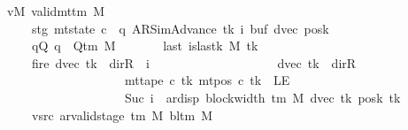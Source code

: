 \begin{isabellebody}
\ \ \ vM{\isacharcolon}{\kern0pt}\ {\isachardoublequoteopen}valid{\isacharunderscore}{\kern0pt}mttm\ M{\isachardoublequoteclose}\isanewline
\ \ \ \ \ \ \ stg{\isacharcolon}{\kern0pt}\ {\isachardoublequoteopen}mt{\isacharunderscore}{\kern0pt}state\ c{\isacharprime}{\kern0pt}\ {\isacharequal}{\kern0pt}\ {\isacharparenleft}{\kern0pt}q{\isacharcomma}{\kern0pt}\ AR{\isacharunderscore}{\kern0pt}SimAdvance{\isacharcomma}{\kern0pt}\ tk{\isacharcomma}{\kern0pt}\ i{\isacharcomma}{\kern0pt}\ buf{\isacharcomma}{\kern0pt}\ dvec{\isacharcomma}{\kern0pt}\ posk{\isacharparenright}{\kern0pt}{\isachardoublequoteclose}\isanewline
\ \ \ \ \ \ \ qQ{\isacharcolon}{\kern0pt}\ {\isachardoublequoteopen}q\ {\isasymin}\ Q{\isacharunderscore}{\kern0pt}tm\ M{\isachardoublequoteclose}\isanewline
\ \ \ \ \ \ \ last{\isacharcolon}{\kern0pt}\ {\isachardoublequoteopen}is{\isacharunderscore}{\kern0pt}last{\isacharunderscore}{\kern0pt}k\ M\ tk{\isachardoublequoteclose}\isanewline
\ \ \ \ \ \ \ fire{\isacharcolon}{\kern0pt}\ {\isachardoublequoteopen}{\isacharparenleft}{\kern0pt}dvec\ tk\ {\isacharequal}{\kern0pt}\ dir{\isachardot}{\kern0pt}R\ {\isasymand}\ i\ {\isacharequal}{\kern0pt}\ {}{\isacharparenright}{\kern0pt}\isanewline
\ \ \ \ \ \ \ \ \ \ \ \ \ \ \ \ \ {\isasymor}\ {\isacharparenleft}{\kern0pt}dvec\ tk\ {\isasymnoteq}\ dir{\isachardot}{\kern0pt}R\isanewline
\ \ \ \ \ \ \ \ \ \ \ \ \ \ \ \ \ \ \ \ \ {\isasymand}\ mt{\isacharunderscore}{\kern0pt}tape\ c{\isacharprime}{\kern0pt}\ tk\ {\isacharparenleft}{\kern0pt}mt{\isacharunderscore}{\kern0pt}pos\ c{\isacharprime}{\kern0pt}\ tk{\isacharparenright}{\kern0pt}\ {\isasymnoteq}\ LE{}\isanewline
\ \ \ \ \ \ \ \ \ \ \ \ \ \ \ \ \ \ \ \ \ {\isasymand}\ Suc\ i\ {\isacharequal}{\kern0pt}\ ar{\isacharunderscore}{\kern0pt}disp\ {\isacharparenleft}{\kern0pt}block{\isacharunderscore}{\kern0pt}width\ {\isacharparenleft}{\kern0pt}{\isasymGamma}{\isacharunderscore}{\kern0pt}tm\ M{\isacharparenright}{\kern0pt}{\isacharparenright}{\kern0pt}\ {\isacharparenleft}{\kern0pt}dvec\ tk{\isacharparenright}{\kern0pt}\ {\isacharparenleft}{\kern0pt}posk\ tk{\isacharparenright}{\kern0pt}{\isacharparenright}{\kern0pt}{\isachardoublequoteclose}\isanewline
\ \ \ \ \ \ \ vsrc{\isacharcolon}{\kern0pt}\ {\isachardoublequoteopen}ar{\isacharunderscore}{\kern0pt}valid{\isacharunderscore}{\kern0pt}stage\ {\isacharparenleft}{\kern0pt}{\isasymGamma}{\isacharunderscore}{\kern0pt}tm\ M{\isacharparenright}{\kern0pt}\ {\isacharparenleft}{\kern0pt}bl{\isacharunderscore}{\kern0pt}tm\ M{\isacharparenright}{\kern0pt}\isanewline

\end{isabellebody}
